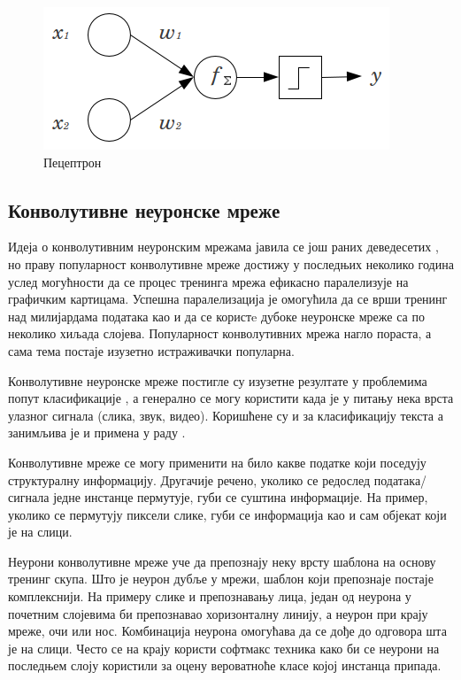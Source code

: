 \documentclass[a4paper]{article}
\begin{document}
\begin{figure}[h!]
\begin{center}
    \includegraphics[scale=0.5]{./resources/perceptron.png}
\end{center}
\caption{Пецептрон}
\label{fig:perceptron}
\end{figure}


\subsection{Конволутивне неуронске мреже}
Идеја о конволутивним неуронским мрежама јавила се још раних деведесетих \cite{covnetBirth},
но праву популарност конволутивне мреже достижу у последњих неколико година услед могућности
да се процес тренинга мрежа ефикасно паралелизује на графичким картицама. Успешна паралелизација
је омогућила да се врши тренинг над милијардама података као и да се користe дубоке неуронске мреже
са по неколико хиљада слојева. Популарност конволутивних мрежа нагло пораста, а сама тема постаје
изузетно истраживачки популарна.

Конволутивне неуронске мреже постигле су изузетне резултате у проблемима попут класификације \cite{NIPS2012_4824,
ciregan, DBLP:journals/corr/SimonyanZ14a},
а генерално се могу користити када је у питању нека врста улазног сигнала (слика, звук, видео). Коришћене су и
за класификацију текста \cite{cnnForText} а занимљива је и примена у раду \cite{cnnForAutism}.

Конволутивне мреже се могу применити на било какве податке који поседују структуралну информацију.
Другачије речено, уколико се редослед података/сигнала једне инстанце пермутује, губи се суштина информације.
На пример, уколико се пермутују пиксели слике, губи се информација као и сам објекат који је на слици.

Неурони конволутивне мреже уче да препознају неку врсту шаблона на основу тренинг скупа. Што је неурон дубље у мрежи,
шаблон који препознаје постаје комплекснији. На примеру слике и препознавању лица,
један од неурона у почетним слојевима би препознавао хоризонталну линију, а неурон при крају мреже, очи или нос. Комбинација неурона
омогућава да се дође до одговора шта је на слици. Често се на крају користи софтмакс техника како би се
неурони на последњем слоју користили за оцену вероватноће класе којој инстанца припада.
\end{document}
